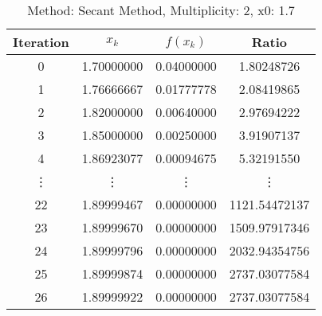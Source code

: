 \begin{table}
\centering
\caption{Method: Secant Method, Multiplicity: 2, x0: 1.7}
\label{tab:table_Secant_Method_2_1_7}
\begin{tabular}{c c c c}
\toprule
Iteration &      $x_k$ &   $f(x_k)$ &         Ratio \\
\midrule
        0 & 1.70000000 & 0.04000000 &    1.80248726 \\
        1 & 1.76666667 & 0.01777778 &    2.08419865 \\
        2 & 1.82000000 & 0.00640000 &    2.97694222 \\
        3 & 1.85000000 & 0.00250000 &    3.91907137 \\
        4 & 1.86923077 & 0.00094675 &    5.32191550 \\
   \vdots &     \vdots &     \vdots &        \vdots \\
       22 & 1.89999467 & 0.00000000 & 1121.54472137 \\
       23 & 1.89999670 & 0.00000000 & 1509.97917346 \\
       24 & 1.89999796 & 0.00000000 & 2032.94354756 \\
       25 & 1.89999874 & 0.00000000 & 2737.03077584 \\
       26 & 1.89999922 & 0.00000000 & 2737.03077584 \\
\bottomrule
\end{tabular}
\end{table}
